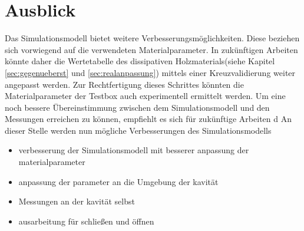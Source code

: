 \section{Ausblick}
Das Simulationsmodell bietet weitere Verbesserungsm\"oglichkeiten. Diese beziehen sich vorwiegend auf die verwendeten Materialparameter.
In zuk\"unftigen Arbeiten k\"onnte daher die Wertetabelle des dissipativen Holzmaterials(siehe Kapitel \ref{sec:gegenueberst} und \ref{sec:realanpassung}) mittels einer Kreuzvalidierung weiter angepasst werden. Zur Rechtfertigung dieses Schrittes k\"onnten die Materialparameter der Testbox auch experimentell ermittelt werden.
Um eine noch bessere \"Ubereinstimmung zwischen dem Simulationsmodell und den Messungen erreichen zu k\"onnen, empfiehlt es sich f\"ur zuk\"unftige Arbeiten d
An dieser Stelle werden nun m\"ogliche Verbesserungen des Simulationsmodells 
\begin{itemize}
    \item verbesserung der Simulationsmodell mit besserer anpassung der materialparameter
    \item anpassung der parameter an die Umgebung der kavität
    \item Messungen an der kavität selbst
    \item ausarbeitung für schließen und öffnen
\end{itemize}